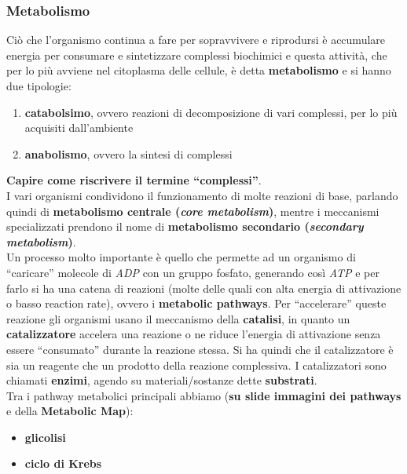\documentclass[a4paper,12pt, oneside]{book}
\begin{document}
\subsubsection{Metabolismo}
Ciò che l'organismo continua a fare per sopravvivere e riprodursi è accumulare
energia per consumare e sintetizzare complessi biochimici e questa attività, che
per lo più avviene nel citoplasma delle cellule, è detta \textbf{metabolismo} e
si hanno due tipologie:
\begin{enumerate}
  \item \textbf{catabolsimo}, ovvero reazioni di decomposizione di vari
  complessi, per lo più acquisiti dall'ambiente 
  \item \textbf{anabolismo}, ovvero la sintesi di complessi
\end{enumerate}
\textbf{Capire come riscrivere il termine ``complessi''}.\\
I vari organismi condividono il funzionamento di molte reazioni di base,
parlando quindi di \textbf{metabolismo centrale (\textit{core metabolism})},
mentre i meccanismi specializzati prendono il nome di \textbf{metabolismo
  secondario (\textit{secondary metabolism})}.\\
Un processo molto importante è quello che permette ad un organismo di
``caricare'' molecole di \textit{ADP} con un gruppo fosfato, generando così
\textit{ATP} e per farlo si ha una catena di reazioni (molte delle quali con
alta energia di attivazione o basso reaction rate), ovvero i \textbf{metabolic
  pathways}. Per ``accelerare'' queste reazione gli organismi usano il
meccanismo della \textbf{catalisi}, in quanto un \textbf{catalizzatore} accelera
una reazione o ne riduce l'energia di attivazione senza essere ``consumato''
durante la reazione stessa. Si ha quindi che il catalizzatore è sia un reagente
che un prodotto della reazione complessiva. I catalizzatori sono chiamati
\textbf{enzimi}, agendo su materiali/sostanze dette \textbf{substrati}.\\
Tra i pathway metabolici principali abbiamo (\textbf{su slide immagini dei
  pathways} e della \textbf{Metabolic Map}): 
\begin{itemize}
  \item \textbf{glicolisi}
  \item \textbf{ciclo di Krebs}
\end{itemize}
\end{document}
